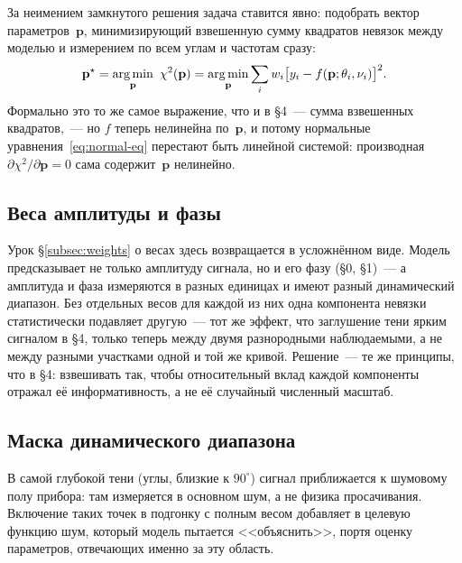 За неимением замкнутого решения задача ставится явно: подобрать вектор параметров~$\mathbf{p}$,
минимизирующий взвешенную сумму квадратов невязок между моделью и измерением по всем углам и
частотам сразу:
\begin{equation}
  \mathbf{p}^\star=\argmin_{\mathbf{p}}\ \chi^2(\mathbf{p})
  =\argmin_{\mathbf{p}}\sum_{i}w_i\big[y_i-f(\mathbf{p};\theta_i,\nu_i)\big]^2 .
  \label{eq:objective}
\end{equation}
Формально это то же самое выражение, что и в §4~--- сумма взвешенных квадратов,~--- но $f$ теперь
нелинейна по~$\mathbf{p}$, и потому нормальные уравнения~\eqref{eq:normal-eq} перестают быть
линейной системой: производная $\partial\chi^2/\partial\mathbf{p}=0$ сама содержит~$\mathbf{p}$
нелинейно.

\subsection{Веса амплитуды и фазы}
\label{subsec:weights-amp-phase}

Урок §\ref{subsec:weights} о весах здесь возвращается в усложнённом виде. Модель предсказывает не
только амплитуду сигнала, но и его фазу (§0, §1)~--- а амплитуда и фаза измеряются в разных
единицах и имеют разный динамический диапазон. Без отдельных весов для каждой из них одна
компонента невязки статистически подавляет другую~--- тот же эффект, что заглушение тени ярким
сигналом в §4, только теперь между двумя разнородными наблюдаемыми, а не между разными участками
одной и той же кривой. Решение~--- те же принципы, что в §4: взвешивать так, чтобы относительный
вклад каждой компоненты отражал её информативность, а не её случайный численный масштаб.

\subsection{Маска динамического диапазона}
\label{subsec:mask}

\begin{warning}
В самой глубокой тени (углы, близкие к $90^\circ$) сигнал приближается к шумовому полу прибора:
там измеряется в основном шум, а не физика просачивания. Включение таких точек в подгонку с полным
весом добавляет в целевую функцию шум, который модель пытается <<объяснить>>, портя оценку
параметров, отвечающих именно за эту область.
\end{warning}

